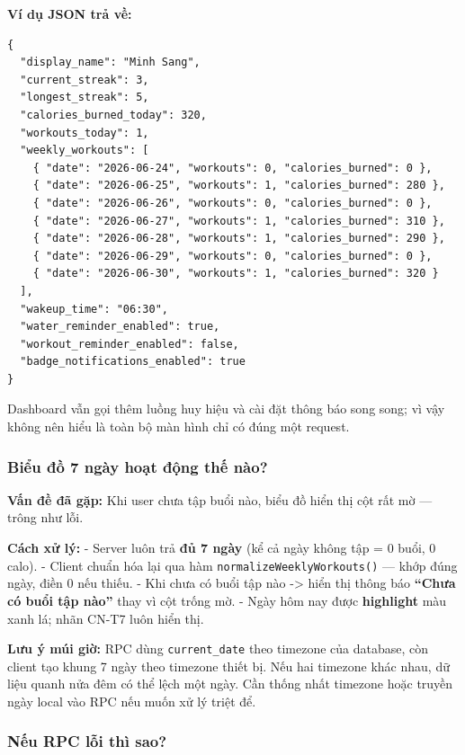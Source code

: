 \documentclass[12pt,a4paper]{article}
\begin{document}
\textbf{Ví dụ JSON trả về:}

\begin{verbatim}
{
  "display_name": "Minh Sang",
  "current_streak": 3,
  "longest_streak": 5,
  "calories_burned_today": 320,
  "workouts_today": 1,
  "weekly_workouts": [
    { "date": "2026-06-24", "workouts": 0, "calories_burned": 0 },
    { "date": "2026-06-25", "workouts": 1, "calories_burned": 280 },
    { "date": "2026-06-26", "workouts": 0, "calories_burned": 0 },
    { "date": "2026-06-27", "workouts": 1, "calories_burned": 310 },
    { "date": "2026-06-28", "workouts": 1, "calories_burned": 290 },
    { "date": "2026-06-29", "workouts": 0, "calories_burned": 0 },
    { "date": "2026-06-30", "workouts": 1, "calories_burned": 320 }
  ],
  "wakeup_time": "06:30",
  "water_reminder_enabled": true,
  "workout_reminder_enabled": false,
  "badge_notifications_enabled": true
}

\end{verbatim}

Dashboard vẫn gọi thêm luồng huy hiệu và cài đặt thông báo song song; vì
vậy không nên hiểu là toàn bộ màn hình chỉ có đúng một request.

\subsubsection{Biểu đồ 7 ngày hoạt động thế
nào?}\label{biux1ec3u-ux111ux1ed3-7-nguxe0y-houx1ea1t-ux111ux1ed9ng-thux1ebf-nuxe0o}

\textbf{Vấn đề đã gặp:} Khi user chưa tập buổi nào, biểu đồ hiển thị cột
rất mờ --- trông như lỗi.

\textbf{Cách xử lý:} - Server luôn trả \textbf{đủ 7 ngày} (kể cả ngày
không tập = 0 buổi, 0 calo). - Client chuẩn hóa lại qua hàm
\texttt{normalizeWeeklyWorkouts()} --- khớp đúng ngày, điền 0 nếu thiếu.
- Khi chưa có buổi tập nào -\textgreater{} hiển thị thông báo
\textbf{``Chưa có buổi tập nào''} thay vì cột trống mờ. - Ngày hôm nay
được \textbf{highlight} màu xanh lá; nhãn CN-T7 luôn hiển thị.

\textbf{Lưu ý múi giờ:} RPC dùng \texttt{current\_date} theo timezone
của database, còn client tạo khung 7 ngày theo timezone thiết bị. Nếu
hai timezone khác nhau, dữ liệu quanh nửa đêm có thể lệch một ngày. Cần
thống nhất timezone hoặc truyền ngày local vào RPC nếu muốn xử lý triệt
để.

\subsubsection{Nếu RPC lỗi thì
sao?}\label{nux1ebfu-rpc-lux1ed7i-thuxec-sao}
\end{document}
